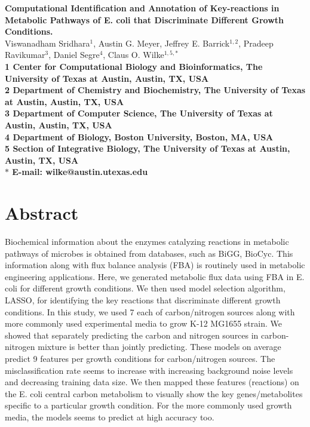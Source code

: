 \documentclass[12pt]{article}
\date{}
\begin{document}
\begin{flushleft}
{\Large
\textbf{Computational Identification and Annotation of Key-reactions in Metabolic Pathways of E. coli that Discriminate Different Growth Conditions.}
}
\bigskip
\noindent
\\
Viswanadham Sridhara$^{1}$,
Austin G. Meyer, 
Jeffrey E. Barrick$^{1,2}$,
Pradeep Ravikumar$^{3}$,
Daniel Segre$^{4}$, 
Claus O. Wilke$^{1,5,\ast}$
\\
\bigskip
\bf{1} Center for Computational Biology and Bioinformatics, The University of Texas at Austin, Austin, TX, USA
\\
\bf{2} Department of Chemistry and Biochemistry, The University of Texas at Austin, Austin, TX, USA
\\
\bf{3} Department of Computer Science, The University of Texas at Austin, Austin, TX, USA
\\
\bf{4} Department of Biology, Boston University, Boston, MA, USA
\\
\bf{5} Section of Integrative Biology, The University of Texas at Austin, Austin, TX, USA
\\
\bigskip
$\ast$ E-mail: wilke@austin.utexas.edu
\end{flushleft}
\newpage
\section*{Abstract}
Biochemical information about the enzymes catalyzing reactions in metabolic pathways of microbes is obtained from databases, such as BiGG, BioCyc. This information along with flux balance analysis (FBA) is routinely used in metabolic engineering applications. Here, we generated metabolic flux data using FBA in E. coli for different growth conditions. We then used model selection algorithm, LASSO, for identifying the key reactions that discriminate different growth conditions. In this study, we used 7 each of carbon/nitrogen sources along with more commonly used experimental media to grow K-12 MG1655 strain. We showed that separately predicting the carbon and nitrogen sources in carbon-nitrogen mixture is better than jointly predicting. These models on average predict 9 features per growth conditions for carbon/nitrogen sources. The misclassification rate seems to increase with increasing background noise levels and decreasing training data size. We then mapped these features (reactions) on the E. coli central carbon metabolism to visually show the key genes/metabolites specific to a particular growth condition. For the more commonly used growth media, the models seems to predict at high accuracy too. 
\end{document}
